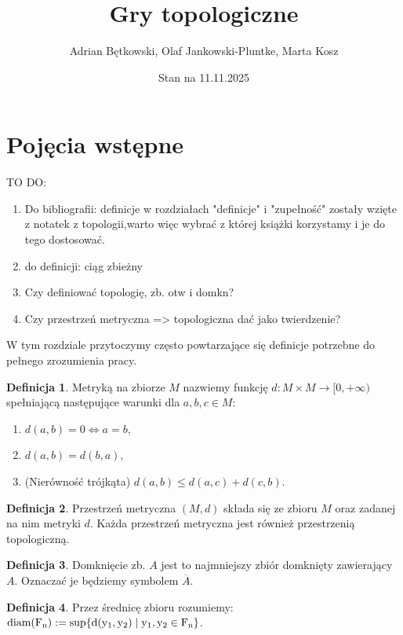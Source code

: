 \documentclass[12pt, a4paper, 2.5cm]{article}
\title{Gry topologiczne}
\author{Adrian Bętkowski, Olaf Jankowski-Pluntke, Marta Kosz}
\date{Stan na 11.11.2025}
\theoremstyle{definition}
\newtheorem{definition}{Definicja}
\begin{document}
	\maketitle
	\section{Pojęcia wstępne}
	TO DO:
	\begin{enumerate}
		\item Do bibliografii: definicje w rozdziałach "definicje" i "zupełność" zostały wzięte z notatek z topologii,warto więc wybrać z której książki korzystamy i je do tego dostosować.
		\item do definicji: ciąg zbieżny
		\item Czy definiować topologię, zb. otw i domkn?
		\item Czy przestrzeń metryczna => topologiczna dać jako twierdzenie?
		
	\end{enumerate}
	
	W tym rozdziale przytoczymy często powtarzające się definicje potrzebne do pełnego zrozumienia pracy.
	
	\begin{definition}
		Metryką na zbiorze $M$ nazwiemy funkcję $d: M \times M \to [0, +\infty)$ spełniającą następujące warunki dla $a,b,c \in M$:
		
		\begin{enumerate} 
			\item $d(a, b) = 0 \iff a = b$,
			\item $d(a, b) = d(b, a)$,
			\item (Nierówność trójkąta) $d(a, b) \leq d(a, c) + d(c, b)$. 
		\end{enumerate}
		
	\end{definition}
	
	\begin{definition}
		Przestrzeń metryczna $(M, d)$ składa się ze zbioru $M$ oraz zadanej na nim metryki $d$. Każda przestrzeń metryczna jest również przestrzenią topologiczną.
	\end{definition}
	
	\begin{definition}
		Domknięcie zb. $A$ jest to najmniejszy zbiór domknięty zawierający $A$. Oznaczać je będziemy symbolem $\overline{A}$.
	\end{definition}
	
	\begin{definition}
		Przez średnicę zbioru rozumiemy:
		$\rm diam(F_n) := \sup\{d(y_1,y_2)\mid y_1,y_2\in F_n\}$.
	\end{definition}
	
\end{document}
